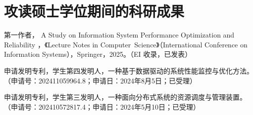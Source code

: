 %
%
%
%
%

\chapter*{攻读硕士学位期间的科研成果}
{}
\thispagestyle{gzubody}

\vspace{0.5\baselineskip}
\noindent
\begin{enumerate}[
  label={\textbf{[\arabic*]}},
  leftmargin=2.4em,
  labelsep=0.55em,
  itemsep=1.2\baselineskip,
  parsep=0pt,
  topsep=0pt,
  align=left
]

  \item
  \begingroup
  \begin{minipage}[t]{\linewidth}
    \RaggedRight
    \setlength{\parskip}{0pt}%
    \setlength{\parindent}{0pt}%
    {\songti 第一作者，}%
    {\rmfamily\normalfont A Study on Information System Performance Optimization and Reliability}%
    {\songti，《Lecture Notes in {\rmfamily\mbox{Computer Science}}》（International Conference on Information Systems），Springer，2025。（EI 收录，已发表）}%
  \end{minipage}
  \endgroup

  \item
  \begin{minipage}[t]{\linewidth}
    \RaggedRight
    \songti 申请发明专利，学生第四发明人，一种基于数据驱动的系统性能监控与优化方法。（申请号：202411059964.8；申请日：2024年8月5日；已受理）
  \end{minipage}

  \item
  \begin{minipage}[t]{\linewidth}
    \RaggedRight
    \songti 申请发明专利，学生第三发明人，一种面向分布式系统的资源调度与管理装置。（申请号：202410572817.4；申请日：2024年5月10日；已受理）
  \end{minipage}

\end{enumerate}